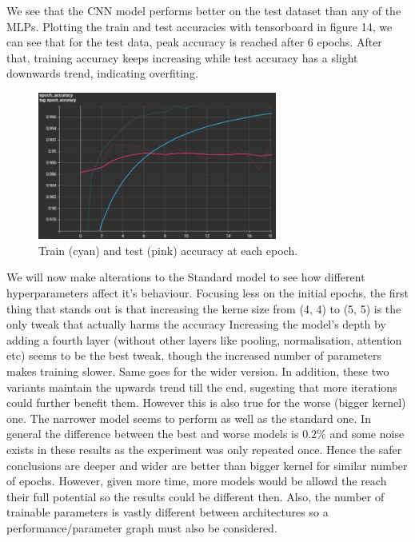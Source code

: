 \documentclass{article}
\begin{document}
We see that the CNN model performs better on the test dataset than any of the MLPs.
Plotting the train and test accuracies with tensorboard in figure 14, we can see that for the test data, peak accuracy is reached after 6 epochs.
After that, training accuracy keeps increasing while test accuracy has a slight downwards trend, indicating overfiting.

\begin{figure}[h!]
    \centering
    \includegraphics[width=0.7\textwidth]{./plots/screenshot9.png}
    \caption{Train (cyan) and test (pink) accuracy at each epoch.}
    \label{fig:plot14}
\end{figure}

We will now make alterations to the Standard model to see how different hyperparameters affect it's behaviour.
Focusing less on the initial epochs, the first thing that stands out is that increasing the kerne size from (4, 4) to (5, 5) is the only tweak that actually harms the accuracy
Increasing the model's depth by adding a fourth layer (without other layers like pooling, normalisation, attention etc) seems to be the best tweak, though the increased number of parameters makes training slower. 
Same goes for the wider version.
In addition, these two variants maintain the upwards trend till the end, sugesting that more iterations could further benefit them. However this is also true for the worse (bigger kernel) one.
The narrower model seems to perform as well as the standard one.
In general the difference between the best and worse models is \(0.2\%\) and some noise exists in these results as the experiment was only repeated once.
Hence the safer conclusions are deeper and wider are better than bigger kernel for similar number of epochs.
However, given more time, more models would be allowd the reach their full potential so the results could be different then.
Also, the number of trainable parameters is vastly different between architectures so a performance/parameter graph must also be considered.
\end{document}
